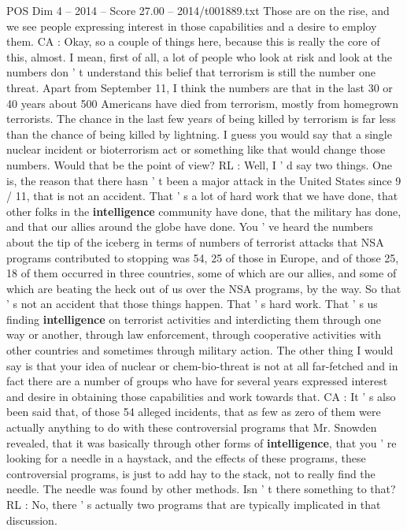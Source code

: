 \begin{textsample}{POS Dim 4 – 2014 – Score 27.00 – 2014/t001889.txt}
Those are on the rise, and we see people expressing interest in those capabilities and a desire to employ them.
CA : Okay, so a couple of things here, because this is really the core of this, almost.
I mean, first of all, a lot of people who look at risk and look at the numbers don ' t understand this belief that terrorism is still the number one threat.
Apart from September 11, I think the numbers are that in the last 30 or 40 years about 500 Americans have died from terrorism, mostly from homegrown terrorists.
The chance in the last few years of being killed by terrorism is far less than the chance of being killed by lightning.
I guess you would say that a single nuclear incident or bioterrorism act or something like that would change those numbers.
Would that be the point of view?
RL : Well, I ' d say two things.
One is, the reason that there hasn ' t been a major attack in the United States since 9 / 11, that is not an accident.
That ' s a lot of hard work that we have done, that other folks in the \textbf{intelligence} community have done, that the military has done, and that our allies around the globe have done.
You ' ve heard the numbers about the tip of the iceberg in terms of numbers of terrorist attacks that NSA programs contributed to stopping was 54, 25 of those in Europe, and of those 25, 18 of them occurred in three countries, some of which are our allies, and some of which are beating the heck out of us over the NSA programs, by the way.
So that ' s not an accident that those things happen.
That ' s hard work.
That ' s us finding \textbf{intelligence} on terrorist activities and interdicting them through one way or another, through law enforcement, through cooperative activities with other countries and sometimes through military action.
The other thing I would say is that your idea of nuclear or chem-bio-threat is not at all far-fetched and in fact there are a number of groups who have for several years expressed interest and desire in obtaining those capabilities and work towards that.
CA : It ' s also been said that, of those 54 alleged incidents, that as few as zero of them were actually anything to do with these controversial programs that Mr.
Snowden revealed, that it was basically through other forms of \textbf{intelligence}, that you ' re looking for a needle in a haystack, and the effects of these programs, these controversial programs, is just to add hay to the stack, not to really find the needle.
The needle was found by other methods.
Isn ' t there something to that?
RL : No, there ' s actually two programs that are typically implicated in that discussion.

\end{textsample}

